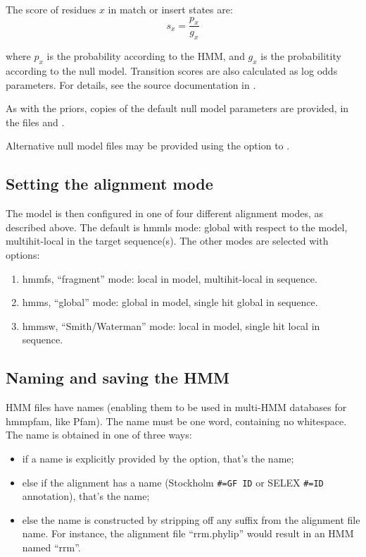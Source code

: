 The score of residues $x$ in match or insert states are:
\[
  s_x = \frac{p_x}{g_x}
\]

where $p_x$ is the probability according to the HMM, and $g_x$ is the
probabilitity according to the null model. Transition scores are also
calculated as log odds parameters. For details, see the source
documentation in .

As with the priors, copies of the default null model parameters are
provided, in the files  and
.

Alternative null model files may be provided using the  option to .

\subsection{Setting the alignment mode}

The model is then configured in one of four different alignment modes,
as described above. The default is hmmls mode: global with respect to
the model, multihit-local in the target sequence(s). The other modes
are selected with options:
\begin{enumerate}
\item[\prog{-f}] hmmfs, ``fragment'' mode: local in model,
multihit-local in sequence.
\item[\prog{-g}] hmms, ``global'' mode: global in model,
single hit global in sequence.
\item[\prog{-s}] hmmsw, ``Smith/Waterman'' mode: local in model,
single hit local in sequence.
\end{enumerate}

\subsection{Naming and saving the HMM}

HMM files have names (enabling them to be used in multi-HMM databases
for hmmpfam, like Pfam). The name must be one word, containing
no whitespace. The name is obtained in one of three ways:

\begin{itemize}
\item if a name  is explicitly provided by the 
      option, that's the name;
\item else if the alignment has a name (Stockholm \verb+#=GF ID+ or
      SELEX \verb+#=ID+ annotation), that's the name;
\item else the name is constructed by stripping off any suffix
      from the alignment file name. For instance, the alignment file
      ``rrm.phylip'' would result in an HMM named ``rrm''.
\end{itemize}
      

